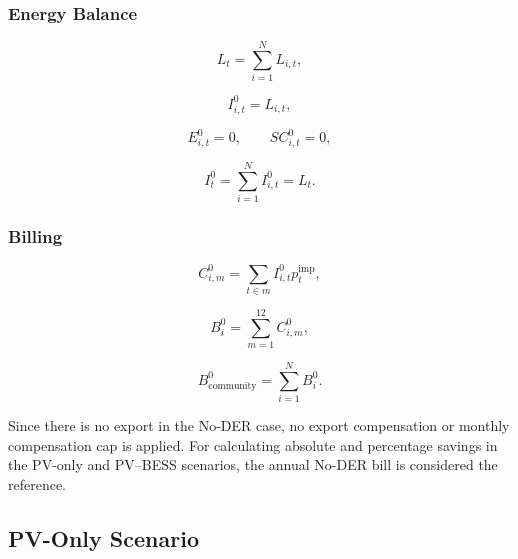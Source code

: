 \subsubsection{Energy Balance}
\label{subsec:no_der_energy_balance}

\begin{equation}
\label{eq:aggregate_load}
L_t = \sum_{i=1}^{N} L_{i,t},
\end{equation}

\begin{equation}
\label{eq:no_der_import_member}
I^0_{i,t} = L_{i,t},
\end{equation}

\begin{equation}
\label{eq:no_der_export_self_consumption}
E^0_{i,t} = 0, \qquad SC^0_{i,t} = 0,
\end{equation}

\begin{equation}
\label{eq:no_der_import_total}
I^0_t = \sum_{i=1}^{N} I^0_{i,t} = L_t.
\end{equation}

\subsubsection{Billing}
\label{subsec:no_der_billing}

\begin{equation}
\label{eq:no_der_monthly_cost}
C^0_{i,m} = \sum_{t \in m} I^0_{i,t} p^{\mathrm{imp}}_t,
\end{equation}

\begin{equation}
\label{eq:no_der_annual_bill_member}
B^0_i = \sum_{m=1}^{12} C^0_{i,m},
\end{equation}

\begin{equation}
\label{eq:no_der_annual_bill_community}
B^0_{\mathrm{community}} = \sum_{i=1}^{N} B^0_i.
\end{equation}

Since there is no export in the No-DER case, no export compensation or monthly compensation cap is applied. For calculating absolute and percentage savings in the PV-only and PV--BESS scenarios, the annual No-DER bill is considered the reference.

\subsection{PV-Only Scenario}
\label{sec:pv_only_scenario_ch4}

